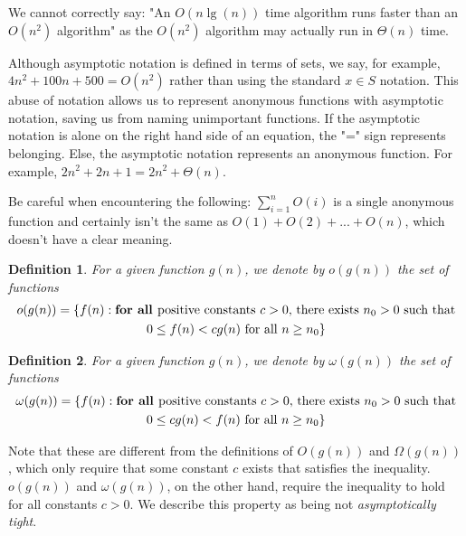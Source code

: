 \documentclass[12pt]{article}
\newtheorem{definition}{Definition}
\begin{document}
We cannot correctly say: "An $O(n\lg(n))$ time algorithm runs faster than an $O(n^2)$ algorithm" as the $O(n^2)$ algorithm
may actually run in $\Theta(n)$ time.

Although asymptotic notation is defined in terms of sets, we say, for example, $4n^2 + 100n + 500 = O(n^2)$ rather than using
the standard $x \in S$ notation. This abuse of notation allows us to represent anonymous functions with asymptotic
notation, saving us from naming unimportant functions. If the asymptotic notation is alone on the right hand side of
an equation, the "=" sign represents belonging. Else, the asymptotic notation represents an anonymous function. For
example, $2n^2 + 2n + 1 = 2n^2 + \Theta(n)$.

Be careful when encountering the following: $\sum_{i = 1}^{n}O(i)$ is a single anonymous function and certainly
isn't the same as $O(1) + O(2) + ... + O(n)$, which doesn't have a clear meaning.

\begin{definition}
    For a given function $g(n)$, we denote by $o(g(n))$ the set of functions
    \begin{multline*}
        o(g(n)) = \{f(n): \textbf{for all }\textnormal{positive constants } c > 0 \textnormal{, there exists } n_0 > 0 \textnormal{ such that}\\
        0 \leq f(n) < cg(n) \textnormal{ for all } n \geq n_0\}
    \end{multline*}
\end{definition}

\begin{definition}
    For a given function $g(n)$, we denote by $\omega(g(n))$ the set of functions
    \begin{multline*}
        \omega(g(n)) = \{f(n): \textbf{for all }\textnormal{positive constants } c > 0 \textnormal{, there exists } n_0 > 0 \textnormal{ such that}\\
        0 \leq cg(n) < f(n) \textnormal{ for all } n \geq n_0\}
    \end{multline*}
\end{definition}
Note that these are different from the definitions of $O(g(n))$ and $\Omega(g(n))$, which only require that some constant $c$ exists that
satisfies the inequality. $o(g(n))$ and $\omega(g(n))$, on the other hand, require the inequality to hold for all constants $c > 0$. We describe
this property as being not \textit{asymptotically tight}.
\end{document}
